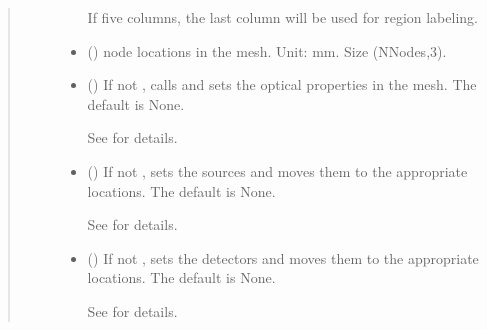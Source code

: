 \documentclass[letterpaper,10pt,english]{sphinxmanual}
\begin{document}
\begin{fulllineitems}
\begin{fulllineitems}
\begin{quote}
\begin{description}
\begin{itemize}
\sphinxAtStartPar
If five columns, the last column will be used for region labeling.


\item {} 
\sphinxAtStartPar
{} () \textendash{} node locations in the mesh. Unit: mm. Size (NNodes,3).

\item {} 
\sphinxAtStartPar
{} (\sphinxstyleliteralemphasis{\sphinxupquote{, }}) \textendash{} 
\sphinxAtStartPar
If not , calls  and sets the optical properties in the mesh. The default is None.

\sphinxAtStartPar
See {\hyperref[\detokenize{_autosummary/nirfasterff.base.dcs_mesh.dcsmesh:nirfasterff.base.dcs_mesh.dcsmesh.set_prop}]{}} for details.


\item {} 
\sphinxAtStartPar
{} (\sphinxstyleliteralemphasis{\sphinxupquote{, }}) \textendash{} 
\sphinxAtStartPar
If not , sets the sources and moves them to the appropriate locations. The default is None.

\sphinxAtStartPar
See {\hyperref[\detokenize{_autosummary/nirfasterff.base.optodes.optode:nirfasterff.base.optodes.optode.touch_sources}]{}} for details.


\item {} 
\sphinxAtStartPar
{} (\sphinxstyleliteralemphasis{\sphinxupquote{, }}) \textendash{} 
\sphinxAtStartPar
If not , sets the detectors and moves them to the appropriate locations. The default is None.

\sphinxAtStartPar
See {\hyperref[\detokenize{_autosummary/nirfasterff.base.optodes.optode:nirfasterff.base.optodes.optode.touch_detectors}]{}} for details.



\end{itemize}
\end{description}
\end{quote}
\end{fulllineitems}
\end{fulllineitems}
\end{document}
